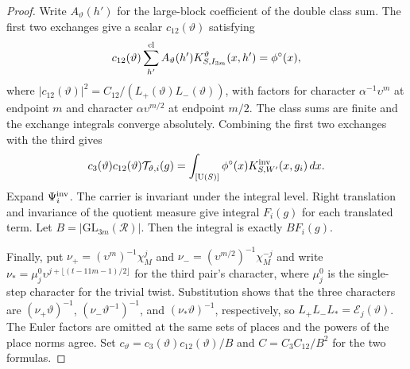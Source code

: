 \begin{proof}
Write $A_\vartheta(h')$ for the large-block coefficient of the double class sum. The first two exchanges give a scalar $c_{12}(\vartheta)$ satisfying
\[
 c_{12}(\vartheta)\sum_{h'}^{\rm cl} A_\vartheta(h')
 K_{S,I_{3m}}^{\vartheta}(x,h')=\phi^\circ(x),
\]
where $|c_{12}(\vartheta)|^2=C_{12}/(L_+(\vartheta)L_-(\vartheta))$, with factors for character $\alpha^{-1}\upsilon^m$ at endpoint $m$ and character $\alpha\upsilon^{m/2}$ at endpoint $m/2$. The class sums are finite and the exchange integrals converge absolutely. Combining the first two exchanges with the third gives
\[
 c_3(\vartheta)c_{12}(\vartheta)\mathcal T_{\vartheta,i}(g)
 =\int_{[\operatorname{U}(S)]}\phi^\circ(x)K_{S,W'}^{\rm inv}(x,g_i)\,dx.
\]
Expand $\Psi_i^{\rm inv}$. The carrier is invariant under the integral level. Right translation and invariance of the quotient measure give integral $F_i(g)$ for each translated term. Let $B=|\mathrm{GL}_{3m}(\mathcal R)|$. Then the integral is exactly $BF_i(g)$.

Finally, put $\nu_+=(\upsilon^{m})^{-1}\chi_M^j$ and $\nu_-=(\upsilon^{m/2})^{-1}\chi_M^{-j}$ and write $\nu_* =\mu_j^0\upsilon^{j+\lfloor(t-11m-1)/2\rfloor}$ for the third pair's character, where $\mu_j^0$ is the single-step character for the trivial twist. Substitution shows that the three characters are $(\nu_+\vartheta)^{-1}$, $(\nu_-\vartheta^{-1})^{-1}$, and $(\nu_*\vartheta)^{-1}$, respectively, so $L_+L_-L_*=\mathcal E_j(\vartheta)$. The Euler factors are omitted at the same sets of places and the powers of the place norms agree. Set $c_\vartheta=c_3(\vartheta)c_{12}(\vartheta)/B$ and $C=C_3C_{12}/B^2$ for the two formulas.
\end{proof}

